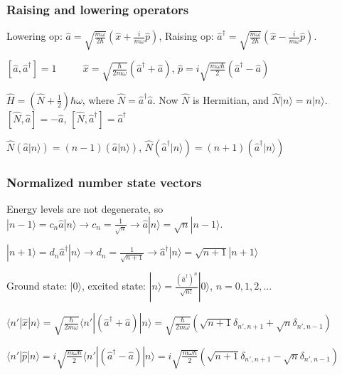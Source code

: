 \subsubsection{Raising and lowering operators}

Lowering op: $\widehat{a} = \sqrt{\frac{m \omega}{2 \hbar}} (\widehat{x} + \frac{i}{m \omega} \widehat{p})$, Raising op: $\widehat{a}^{\dag} = \sqrt{\frac{m \omega}{2 \hbar}} (\widehat{x} - \frac{i}{m \omega} \widehat{p})$.

$[\widehat{a}, \widehat{a}^{\dag}] = 1$ $\qquad$ $\widehat{x} = \sqrt{\frac{\hbar}{2 m \omega}} (\widehat{a}^{\dag} + \widehat{a})$, $\widehat{p} = i \sqrt{\frac{m \omega \hbar}{2}} (\widehat{a}^{\dag} - \widehat{a})$

$\widehat{H} = (\widehat{N} + \frac{1}{2}) \hbar \omega$, where $\widehat{N} = \widehat{a}^{\dag} \widehat{a}$. Now $\widehat{N}$ is Hermitian, and $\widehat{N} | n \rangle = n | n \rangle$.
$[\widehat{N}, \widehat{a}] = -\widehat{a}$, $[\widehat{N}, \widehat{a}^{\dag}] = \widehat{a}^{\dag}$

$\widehat{N} (\widehat{a} | n \rangle) = (n-1)(\widehat{a} | n \rangle)$, $\widehat{N} (\widehat{a}^{\dag} | n \rangle) = (n + 1)(\widehat{a}^{\dag} | n \rangle)$ 

\subsubsection{Normalized number state vectors}
Energy levels are not degenerate, so
$|n - 1 \rangle = c_n \widehat{a} | n \rangle \rightarrow c_n = \frac{1}{\sqrt{n}} \rightarrow \widehat{a} | n \rangle = \sqrt{n} | n - 1 \rangle$.

$|n + 1 \rangle = d_n \widehat{a}^{\dag} | n \rangle \rightarrow d_n = \frac{1}{\sqrt{n+1}} \rightarrow \widehat{a}^{\dag} | n \rangle = \sqrt{n+1} | n + 1 \rangle$

Ground state: $|0 \rangle$, excited state: $|n \rangle = \frac{(\widehat{a}^{\dag})^n}{\sqrt{n!}} | 0 \rangle$, $n=0,1,2,...$

\tiny
$\langle n' | \widehat{x} | n \rangle = \sqrt{\frac{\hbar}{2m\omega}} \langle n' | (\widehat{a}^{\dag} + \widehat{a}) | n \rangle = \sqrt{\frac{\hbar}{2 m \omega}} (\sqrt{n+1} \delta_{n', n+1} + \sqrt{n} \delta_{n', n-1})$

$\langle n' | \widehat{p} | n \rangle = i \sqrt{\frac{m \omega \hbar}{2}} \langle n' | (\widehat{a}^{\dag} - \widehat{a}) | n \rangle = i \sqrt{\frac{m \omega \hbar}{2}} (\sqrt{n+1} \delta_{n', n+1} - \sqrt{n} \delta_{n', n-1})$

